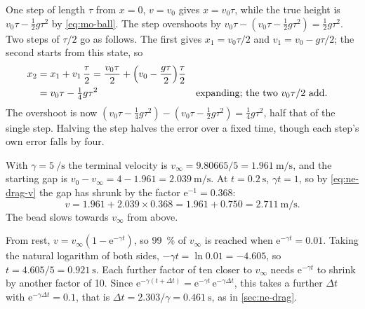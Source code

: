 One step of length $\tau$ from $x = 0$, $v = v_0$
gives $x = v_0\tau$, while the true height is $v_0\tau - \tfrac12 g\tau^2$
by \cref{eq:mo-ball}. The step overshoots by $v_0\tau - (v_0\tau -
\tfrac12 g\tau^2) = \tfrac12 g\tau^2$. Two steps of $\tau/2$ go as
follows. The first gives $x_1 = v_0\tau/2$ and $v_1 = v_0 - g\tau/2$; the
second starts from this state, so
\begin{align*}
   x_2 &= x_1 + v_1\,\frac{\tau}{2}
      = \frac{v_0\tau}{2} + \Bigl(v_0 - \frac{g\tau}{2}\Bigr)\frac{\tau}{2}\\
   &= v_0\tau - \tfrac14 g\tau^2
      && \text{expanding; the two $v_0\tau/2$ add.}
\end{align*}
The overshoot is now $(v_0\tau - \tfrac14 g\tau^2) - (v_0\tau - \tfrac12
g\tau^2) = \tfrac14 g\tau^2$, half that of the single step. Halving the
step halves the error over a fixed time, though each step's own error
falls by four.

With $\gamma = \SI{5}{\per\second}$ the terminal
velocity is $v_\infty = 9.80665/5 = \SI{1.961}{\metre\per\second}$, and
the starting gap is $v_0 - v_\infty = 4 - 1.961 =
\SI{2.039}{\metre\per\second}$. At $t = \SI{0.2}{\second}$, $\gamma t = 1$,
so by \cref{eq:ne-drag-v} the gap has shrunk by the factor $\mathrm{e}^{-1}
= 0.368$:
\begin{equation*}
   v = 1.961 + 2.039\times0.368 = 1.961 + 0.750
   = \SI{2.711}{\metre\per\second} .
\end{equation*}
The bead slows towards $v_\infty$ from above.

From rest, $v = v_\infty(1 -
\mathrm{e}^{-\gamma t})$, so \SI{99}{\percent} of $v_\infty$ is reached
when $\mathrm{e}^{-\gamma t} = 0.01$. Taking the natural logarithm of both
sides, $-\gamma t = \ln 0.01 = -4.605$, so $t = 4.605/5 =
\SI{0.921}{\second}$. Each further factor of ten closer to $v_\infty$
needs $\mathrm{e}^{-\gamma t}$ to shrink by another factor of 10. Since
$\mathrm{e}^{-\gamma(t + \Delta t)} = \mathrm{e}^{-\gamma t}\,
\mathrm{e}^{-\gamma\Delta t}$, this takes a further $\Delta t$ with
$\mathrm{e}^{-\gamma\Delta t} = 0.1$, that is $\Delta t = 2.303/\gamma =
\SI{0.461}{\second}$, as in \cref{sec:ne-drag}.

